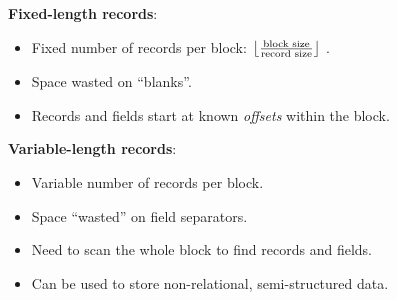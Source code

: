 %
%


%
%
\begin{frame}

\textbf{Fixed-length records}:
\begin{itemize}[-,topsep=-0.5em]
\item Fixed number of records per block: \(\floor*{\frac{\text{block size}}{\text{record size}}}\) .

\item Space wasted on ``blanks''.

\item Records and fields start at known \emph{offsets} within the block.
\end{itemize}

\vfill

\textbf{Variable-length records}:

\begin{itemize}[-,topsep=-0.5em]
\item Variable number of records per block.

\item Space ``wasted'' on field separators.

\item Need to scan the whole block to find records and fields.

\item Can be used to store non-relational, semi-structured data.
\end{itemize}

\end{frame}


